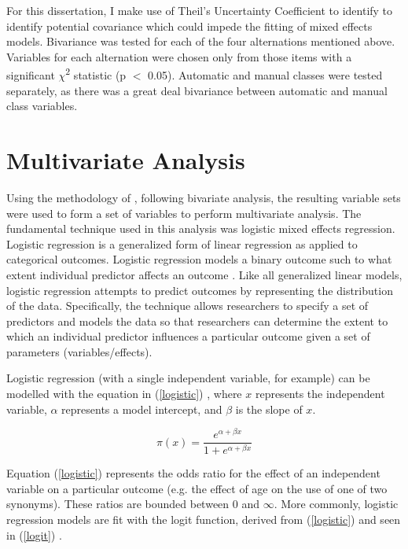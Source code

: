 For this dissertation, I make use of Theil's Uncertainty Coefficient to identify to identify potential covariance which could impede the fitting of mixed effects models. Bivariance was tested for each of the four alternations mentioned above. Variables for each alternation were chosen only from those items with a significant $\chi$\textsuperscript{2} statistic (p $<$ 0.05). Automatic and manual classes were tested separately, as there was a great deal bivariance between automatic and manual class variables. 

\section{Multivariate Analysis}

Using the methodology of \citet{arppe2008univariate}, following bivariate analysis, the resulting variable sets were used to form a set of variables to perform multivariate analysis. The fundamental technique used in this analysis was logistic mixed effects regression. Logistic regression is a generalized form of linear regression as applied to categorical outcomes. Logistic regression models a binary outcome such to what extent individual predictor affects an outcome  \citep[163]{agresti2013categorical}. Like all generalized linear models, logistic regression attempts to predict outcomes by representing the distribution of the data. Specifically, the technique allows researchers to specify a set of predictors and models the data so that  researchers can determine the extent to which an individual predictor influences a particular outcome given a set of parameters (variables/effects).

Logistic regression (with a single independent variable, for example) can be modelled with the equation in (\ref{logistic}) \citep[163]{agresti2013categorical}, where $x$ represents the independent variable, $\alpha$ represents a model intercept, and $\beta$ is the slope of $x$. 

\begin{equation}
\pi(x) = \frac{e^{\alpha + \beta x}}{1+e^{\alpha + \beta x}}
\label{logistic}
\end{equation}


Equation (\ref{logistic}) represents the odds ratio for the effect of an independent variable on a particular outcome (e.g. the effect of age on the use of one of two synonyms). These ratios are bounded between 0 and $\infty$. More commonly, logistic regression models are fit with the logit function, derived from (\ref{logistic}) and seen in (\ref{logit}) \citep[163]{agresti2013categorical}. 

